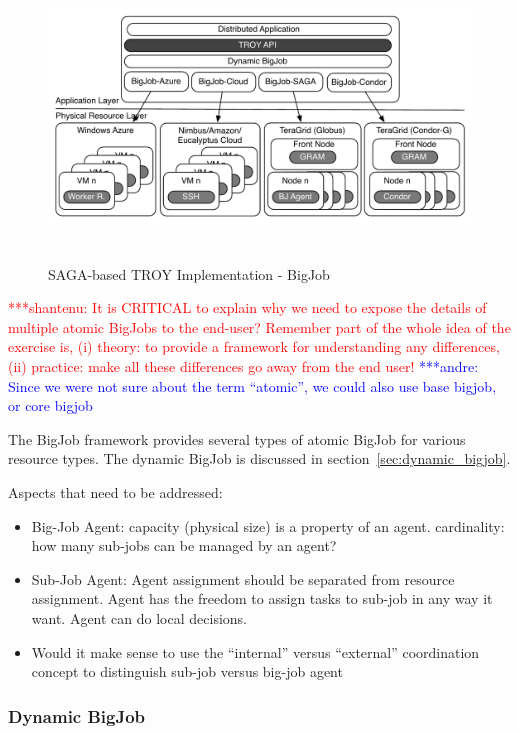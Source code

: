\documentclass[conference,final]{IEEEtran}
\newcommand{\jhanote}[1]{ {\textcolor{red} { ***shantenu: #1 }}}
\newcommand{\alnote}[1]{ {\textcolor{blue} { ***andre: #1 }}}
\newcommand{\alnote}[1]{}
\newcommand{\jhanote}[1]{}
\begin{document}
\begin{figure}[htbp]
	\centering
		\includegraphics[height=3in]{figures/distributed_pilot_job.pdf}
	\caption{SAGA-based TROY Implementation - BigJob}
	\label{fig:figures_distributed_pilot_job}
\end{figure}


\jhanote{It is CRITICAL to explain why we need to expose the details
  of multiple atomic BigJobs to the end-user? Remember part of the
  whole idea of the exercise is, (i) theory: to provide a framework
  for understanding any differences, (ii) practice: make all these
  differences go away from the end user!}
\alnote{Since we were not sure about the term ``atomic'', we could also use base 
bigjob, or core bigjob}

The BigJob framework provides several types of atomic BigJob for
various resource types. The dynamic BigJob is discussed in
section~\ref{sec:dynamic_bigjob}.


Aspects that need to be addressed:
\begin{itemize}
    \item Big-Job Agent: capacity (physical size) is a property of an agent. 
	cardinality: how many sub-jobs can be managed by an agent?
	\item Sub-Job Agent: Agent assignment should be separated from resource 
	assignment. Agent has the freedom to assign tasks to sub-job in any way 
	it want. Agent can do local decisions.    
  \item Would it make sense to use the ``internal'' versus
    ``external'' coordination concept to distinguish sub-job
    versus big-job agent
\end{itemize}

\subsubsection{Dynamic BigJob}
\end{document}
